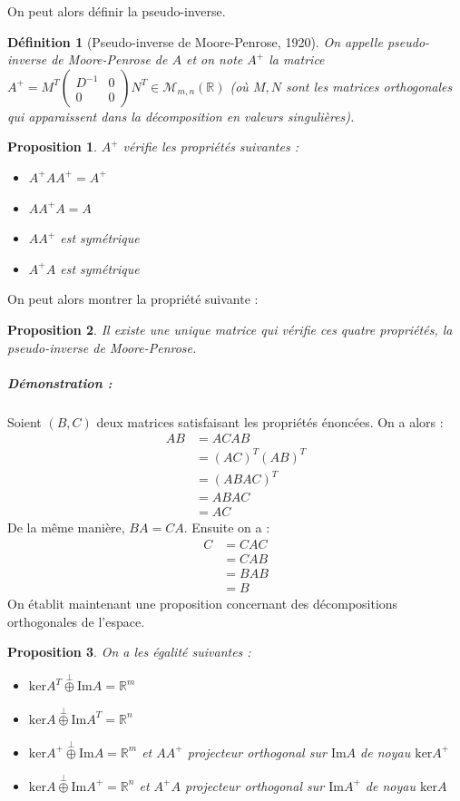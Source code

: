 \documentclass[10pt,a4paper]{article}
\newtheorem{mydef}{Définition}
\newtheorem{prop}{Proposition}
\begin{document}
On peut alors définir la pseudo-inverse.
\begin{mydef}[Pseudo-inverse de Moore-Penrose, 1920]
On appelle pseudo-inverse de Moore-Penrose de $A$ et on note $A^+$ la matrice $A^+=M^T \left( \begin{matrix}
D^{-1} & 0 \\ 0 & 0
\end{matrix}\right)N^T \in \mathcal{M}_{m,n}(\mathbb{R})$ (où $M, N$ sont les matrices orthogonales qui apparaissent dans la décomposition en valeurs singulières).
\end{mydef}
\begin{prop}
$A^+$ vérifie les propriétés suivantes :
\begin{itemize}
\item $A^+A A^+=A^+$
\item $A A^+ A =A$
\item $A A^+$ est symétrique
\item $A^+ A$ est symétrique
\end{itemize}
\end{prop}
On peut alors montrer la propriété suivante :
\begin{prop}
Il existe une unique matrice qui vérifie ces quatre propriétés, la pseudo-inverse de Moore-Penrose.
\end{prop}
\subparagraph{Démonstration :} Soient $(B,C)$ deux matrices satisfaisant les propriétés énoncées.
On a alors :
\begin{equation}
\begin{aligned}
AB&=ACAB \\
&=(AC)^T(AB)^T \\
&=(ABAC)^T \\
&=ABAC \\
&=AC
\end{aligned}
\end{equation}
De la même manière, $BA=CA$.
Ensuite on a :
\begin{equation}
\begin{aligned}
C&=CAC\\
&=CAB\\
&=BAB\\
&=B
\end{aligned}
\end{equation}
On établit maintenant une proposition concernant des décompositions orthogonales de l'espace.
\begin{prop}
On a les égalité suivantes :
\begin{itemize}
\item $\text{ker}A^T \overset{\perp}{\oplus} \text{Im}A = \mathbb{R}^m$
\item $\text{ker}A \overset{\perp}{\oplus} \text{Im}A^T = \mathbb{R}^n$
\item $\text{ker}A^+ \overset{\perp}{\oplus} \text{Im}A = \mathbb{R}^m$ et $AA^+$ projecteur orthogonal sur $\text{Im}A$ de noyau $\text{ker}A^+$
\item $\text{ker}A \overset{\perp}{\oplus} \text{Im}A^+ = \mathbb{R}^n$ et $A^+A$ projecteur orthogonal sur $\text{Im}A^+$ de noyau $\text{ker}A$
\end{itemize}
\end{prop}
\end{document}

